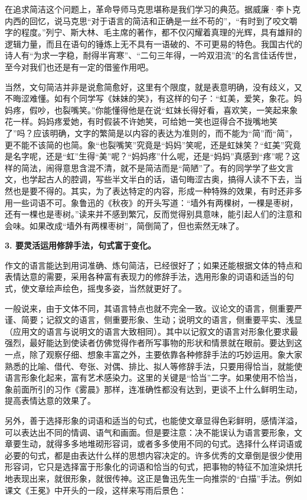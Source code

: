 在追求简洁这个问题上，革命导师马克思堪称是我们学习的典范。据威廉·李卜克内西的回忆，说马克思“对于语言的简洁和正确是一丝不苟的”，“有时到了咬文嚼字的程度。”列宁、斯大林、毛主席的著作，都不仅闪耀着真理的光辉，具有雄辩的逻辑力量，而且在语句的锤炼上无不具有一语破的、不可更易的特色。我国古代的诗人有“为求一字稳，耐得半宵寒”、“二句三年得，一吟双泪流”的名言佳话传世，至今对我们也还是有一定的借鉴作用吧。

当然，文句简洁并非是说愈简愈好，这里有个限度，就是表意明确，没有歧义，又不晦涩难懂。如有个同学写《妹妹的笑》，有这样的句子：“虹美，爱笑，象花。妈妈疼，假吵，也裂嘴笑。”你能懂得他是在说“虹妹长得好看，喜欢笑，一笑起来象花一样。妈妈疼爱她，有时假装不许她笑，可给她一笑也逗得合不拢嘴地笑了”吗？应该明确，文字的繁简是以内容的表达为准则的，而不能为“简”而“简”，更不能不该简的也简。象“也裂嘴笑”究竟是“妈妈”笑呢，还是虹妹笑？“虹美”究竟是名字呢，还是“虹”生得“美”呢？“妈妈疼”什么呢，还是“妈妈”真感到“疼”呢？这样的简法，闹得意思含混不清，就不是简洁而是“简陋”了。有的同学学了些文言文，也学起古人的腔调，写些半文半白的话，语句晦涩古奥，搞得人读不下去，当然也是要不得的。其实，为了表达特定的内容，形成一种特殊的效果，有时还非多用一些词语不可。象鲁迅的《秋夜》的开头写道：“墙外有两棵树，一棵是枣树，还有一棵也是枣树。”读来并不感到繁冗，反而觉得别具意味，能引起人们的注意和会味。如果改成“墙外有两棵枣树”，简倒简了，但也索然无味了。

\textbf{3. 要灵活运用修辞手法，句式富于变化。}

作文的语言能达到用词准确、炼句简洁，已经很好了；如果还能根据文体的特点和表情达意的需要，采用各种富有表现力的修辞手法，选用形象的词语和适当的句式，使文章绘声绘色，摇曳多姿，当然就更好了。

一般说来，由于文体不同，其语言特点也就不完全一致。议论文的语言，侧重要严谨、简要；记叙文的语言，侧重要形象、生动；说明文的语言，侧重要平实、浅显（应用文的语言与说明文的语言大致相同）。其中以记叙文的语言对形象化要求最强烈，最好能达到使读者仿佛觉得作者所写事物的形状和情景就在眼前。要达到这一点，除了观察仔细、想象丰富之外，主要依靠各种修辞手法的巧妙运用。象大家熟悉的比喻、借代、夸张、对偶、排比、拟人等修辞手法，只要用得恰当，就能使语言形象化起来，富有艺术感染力。这里的关键是“恰当”二字。如果使用不恰当，象前面所引的习作《雾晨》那样，连准确性都没有达到，更谈不上什么鲜明生动，提高表情达意的效果了。

另外，善于选择形象的词语和适当的句式，也能使文章显得色彩鲜明，感情洋溢，可以表达出不同的情调、语气和画面。但是要注意：决不能误认为语言要形象，文章要生动，就得多多地堆砌形容词，或者多多使用不同的句式。选择什么样词语或必要的句式，都是由表达什么样的思想内容决定的。许多优秀的文章倒是很少使用形容词，它只是选择富于形象化的词语和恰当的句式，把事物的特征不加渲染烘托地表现出来，就很形象，就很传神。这正是鲁迅先生一向推崇的“白描”手法。例如课文《王冕》中开头的一段，这样来写雨后景色：

